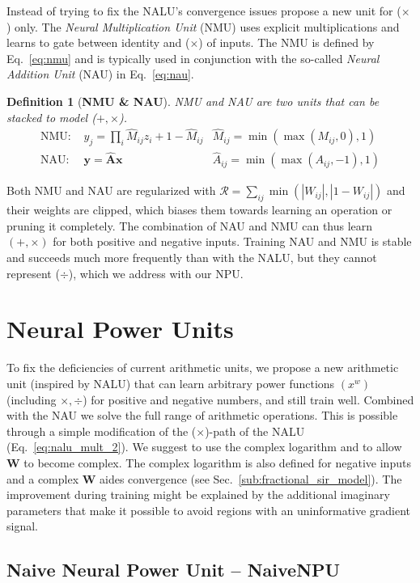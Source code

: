 \documentclass[9pt]{article}
\newtheorem*{definition}{Definition}
\begin{document}
Instead of trying to fix the NALU's convergence issues
\cite{madsen_neural_2020} propose a new unit for ($\times$) only.
The \emph{Neural Multiplication Unit} (NMU) uses explicit multiplications and learns
to gate between identity and ($\times$) of inputs. The NMU is
defined by Eq.~\ref{eq:nmu} and is typically used in conjunction with the
so-called \emph{Neural Addition Unit} (NAU) in Eq.~\ref{eq:nau}.
\begin{definition}[{\bf NMU \& NAU}]
  NMU and NAU are two units that can be stacked to model ($+,\times$).
\begin{align}
  \label{eq:nmu}
  \text{NMU: } &y_j = \prod_i \hat M_{ij} z_{i} + 1 - \hat M_{ij}  & \hat M_{ij}=\min(\max(M_{ij}, 0), 1)\\
  \label{eq:nau}
  \text{NAU: } &\bm y = \bm{\hat{A}} \bm x & \hat A_{ij}=\min(\max(A_{ij}, -1), 1)
\end{align}
\end{definition}
Both NMU and NAU are regularized with $\mathcal{R} = \sum_{ij} \min(|W_{ij}|,
|1-W_{ij}|)$ and their weights are clipped, which biases them towards learning
an operation or pruning it completely.  The combination of NAU and NMU can thus
learn $(+,\times)$ for both positive and negative inputs. Training NAU and NMU
is stable and succeeds much more frequently than with the NALU, but they cannot
represent ($\div$), which we address with our NPU.


\section{Neural Power Units}%
\label{sec:neural_power_unit}

To fix the deficiencies of current arithmetic units, we propose a new
arithmetic unit (inspired by NALU) that can learn arbitrary power functions $(x^w)$ (including
$\times,\div$) for positive and negative numbers, and still train well.
Combined with the NAU we solve the full range of arithmetic operations.
This is possible through a simple modification of the ($\times$)-path of the
NALU (Eq.~\ref{eq:nalu_mult_2}).  We suggest to use the complex logarithm and
to allow $\bm W$ to become complex.  The complex logarithm is also defined for
negative inputs and a complex $\bm W$ aides convergence (see
Sec.~\ref{sub:fractional_sir_model}). The improvement during training might be
explained by the additional imaginary parameters that make it possible to avoid
regions with an uninformative gradient signal.


\subsection{Naive Neural Power Unit -- NaiveNPU}%
\label{sub:naive_npu}
\end{document}
